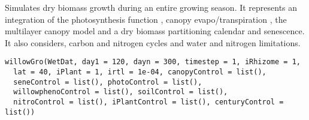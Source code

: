 \documentclass[letterpaper]{book}
\begin{document}
%
\begin{Description}\relax
Simulates dry biomass growth during an entire growing
season.  It represents an integration of the photosynthesis
function , canopy evapo/transpiration
, the multilayer canopy model
 and a dry biomass partitioning calendar
and senescence. It also considers, carbon and nitrogen
cycles and water and nitrogen limitations.
\end{Description}
%
\begin{Usage}
\begin{verbatim}
willowGro(WetDat, day1 = 120, dayn = 300, timestep = 1, iRhizome = 1,
  lat = 40, iPlant = 1, irtl = 1e-04, canopyControl = list(),
  seneControl = list(), photoControl = list(),
  willowphenoControl = list(), soilControl = list(),
  nitroControl = list(), iPlantControl = list(), centuryControl = list())
\end{verbatim}
\end{Usage}
%
\end{document}

